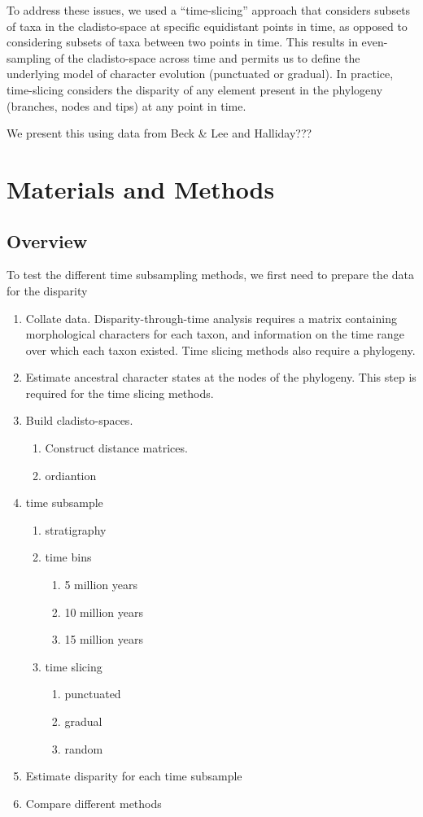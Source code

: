 \documentclass[12pt,a4paper]{article}
\begin{document}
To address these issues, we used a ``time-slicing'' approach that considers subsets of taxa in the cladisto-space at specific equidistant points in time, as opposed to considering subsets of taxa between two points in time.
This results in even-sampling of the cladisto-space across time and permits us to define the underlying model of character evolution (punctuated or gradual).  
In practice, time-slicing considers the disparity of any element present in the phylogeny (branches, nodes and tips) at any point in time.

We present this using data from Beck \& Lee and Halliday???  
	
	
\section{Materials and Methods}
\subsection{Overview}
\label{overview-section}
To test the different time subsampling methods, we first need to prepare the data for the disparity 

\begin{enumerate}
  \item Collate data. Disparity-through-time analysis requires a matrix containing morphological characters for each taxon, and information on the time range over which each taxon existed. Time slicing methods also require a phylogeny.
  \item Estimate ancestral character states at the nodes of the phylogeny. This step is required for the time slicing methods.
  \item Build cladisto-spaces.  
    \begin{enumerate}
      \item Construct distance matrices.
      \item ordiantion
    \end{enumerate}
  \item time subsample
    \begin{enumerate}
      \item stratigraphy
      \item time bins
        \begin{enumerate}
          \item 5 million years
          \item 10 million years
          \item 15 million years
        \end{enumerate}  
      \item time slicing
        \begin{enumerate}
          \item punctuated
          \item gradual
          \item random
        \end{enumerate}  
    \end{enumerate}
  \item Estimate disparity for each time subsample
  \item Compare different methods
\end{enumerate}
\end{document}
